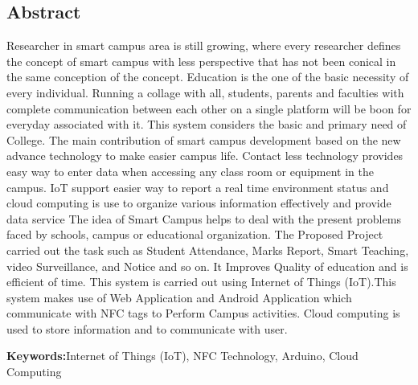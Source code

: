 \documentclass[10pt,a4paper]
{article}
\numberwithin{table}{section}
\begin{document}
		


\newpage					%
\pagestyle{empty}
							
		\newpage					%
\pagestyle{plain}
		\begin{center}				%
			
				\section*{Abstract}
				\vspace{.2 in}       %
			
		\end{center}
		

		\begin{normalsize}
{

					Researcher in smart campus area is still growing, where every researcher defines the concept of smart campus with less perspective that has not been conical in the same conception of the concept. Education is the one of the basic necessity of every individual. Running a collage with all, students, parents and faculties with complete communication between each other on a single platform will be boon for everyday associated with it. This system considers the basic and primary need of College. The main contribution of smart campus development based on the new advance technology to make easier campus life. Contact less technology provides easy way to enter data when accessing any class room or equipment in the campus. IoT support easier way to report a real time environment status and cloud computing is use to organize various information effectively and provide data service The idea of Smart Campus helps to deal with the present problems faced by schools, campus or educational organization. The Proposed Project carried out the task such as Student Attendance, Marks Report, Smart Teaching, video Surveillance, and Notice and so on. It Improves Quality of education and is efficient of time. This system is carried out using Internet of Things (IoT).This system makes use of Web Application and Android Application which communicate with NFC tags to Perform Campus activities. Cloud computing is used to store information and to communicate with user.


\vspace{0.5 in}  

{\textbf {Keywords:}Internet of Things (IoT), NFC Technology, Arduino, Cloud Computing}
	
}
				
		\end{normalsize}
\end{document}
